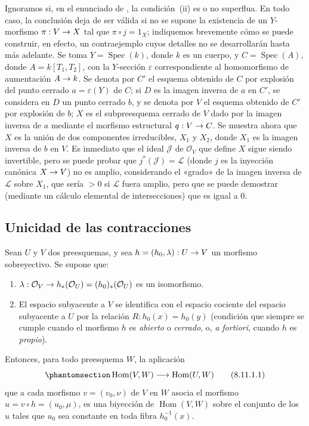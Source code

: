 \documentclass[oneside,10pt]{amsart}
\makeatletter
\newcommand{\ega@arrow}[2]{\mathchoice{#1}{#2}{#2}{#2}}
\renewcommand{\to}{\ega@arrow{\longrightarrow}{\rightarrow}}
\newcommand{\oldpage}[2][]{\marginnote{\normalfont\footnotesize\textbf{#1}~|~#2}\ignorespaces}
\let\EGAOriginalLabel\label
\renewcommand{\label}[1]{\phantomsection\EGAOriginalLabel{#1}}
\makeatother
\begin{document}
\begin{remark}[8.10.7]
\label{II.8.10.7-fr}
Ignoramos si, en el enunciado de , la condición~(ii) es o no superflua.
En todo caso, la conclusión deja de ser válida si no se supone la existencia de un $Y$-morfismo $\pi:V\to X$ tal que $\pi\circ j=1_X$;
indiquemos brevemente cómo se puede construir, en efecto, un contraejemplo cuyos detalles no se desarrollarán hasta más adelante.
Se toma $Y=\operatorname{Spec}(k)$, donde $k$ es un cuerpo, y $C=\operatorname{Spec}(A)$, donde $A=k[T_1,T_2]$, con la $Y$-sección $\varepsilon$ correspondiente al homomorfismo de aumentación $A\to k$.
Se denota por $C'$ el esquema obtenido de $C$ por explosión del punto cerrado $a=\varepsilon(Y)$ de $C$;
si $D$ es la imagen inversa de $a$ en $C'$, se considera en $D$ un punto cerrado $b$,
\oldpage[II]{189}
y se denota por $V$ el esquema obtenido de $C'$ por explosión de $b$;
$X$ es el subpreesquema cerrado de $V$ dado por la imagen inversa de $a$ mediante el morfismo estructural $q:V\to C$.
Se muestra ahora que $X$ es la unión de dos componentes irreducibles, $X_1$ y $X_2$, donde $X_1$ es la imagen inversa de $b$ en $V$.
Es inmediato que el ideal $\mathcal{J}$ de $\mathcal{O}_V$ que define $X$ sigue siendo invertible, pero se puede probar que $j^*(\mathcal{J})=\mathcal{L}$ (donde $j$ es la inyección canónica $X\to V$) no es amplio, considerando el «grado» de la imagen inversa de $\mathcal{L}$ sobre $X_1$, que sería $>0$ si $\mathcal{L}$ fuera amplio, pero que se puede demostrar (mediante un cálculo elemental de intersecciones) que es igual a 0.
\end{remark}

\subsection{Unicidad de las contracciones}
\label{subsection:II.8.11-fr}

\begin{lemma}[8.11.1]
\label{II.8.11.1-fr}
Sean $U$ y $V$ dos preesquemas, y sea $h=(h_0,\lambda):U\to V$ un morfismo sobreyectivo.
Se supone que:
\begin{enumerate}
  \item[$1^\circ$] $\lambda:\mathcal{O}_V\to h_*(\mathcal{O}_U)
  =(h_0)_*(\mathcal{O}_U)$ es un isomorfismo.
  \item[$2^\circ$] El espacio subyacente a $V$ se identifica con el espacio cociente del espacio subyacente a $U$ por la relación
  $R:h_0(x)=h_0(y)$
  \textup{(condición que siempre se cumple cuando el morfismo $h$ es \emph{abierto} o \emph{cerrado}, o, \emph{a fortiori}, cuando $h$ es \emph{propio})}.
\end{enumerate}
Entonces, para todo preesquema $W$, la aplicación
\begin{equation}
\label{II.8.11.1.1-fr}
  \operatorname{Hom}(V,W)\longrightarrow\operatorname{Hom}(U,W)
\tag{8.11.1.1}
\end{equation}
que a cada morfismo $v=(v_0,\nu)$ de $V$ en $W$ asocia el morfismo $u=v\circ h=(u_0,\mu)$, es una biyección de $\operatorname{Hom}(V,W)$ sobre el conjunto de los $u$ tales que $u_0$ sea constante en toda fibra $h_0^{-1}(x)$.
\end{lemma}
\end{document}
